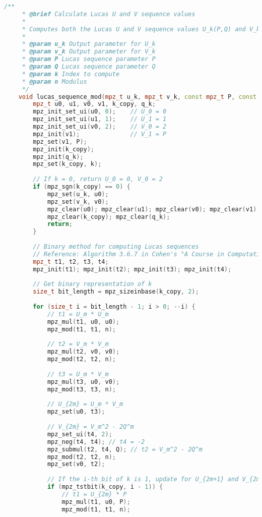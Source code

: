 \begin{lstlisting}[language=C++, caption=Baillie-PSW Test Implementation]
    /**
     * @brief Calculate Lucas U and V sequence values
     * 
     * Computes both the Lucas U and V sequence values U_k(P,Q) and V_k(P,Q) mod n
     * 
     * @param u_k Output parameter for U_k
     * @param v_k Output parameter for V_k
     * @param P Lucas sequence parameter P
     * @param Q Lucas sequence parameter Q
     * @param k Index to compute
     * @param n Modulus
     */
    void lucas_sequence_mod(mpz_t u_k, mpz_t v_k, const mpz_t P, const mpz_t Q, const mpz_t k, const mpz_t n) {
        mpz_t u0, u1, v0, v1, k_copy, q_k;
        mpz_init_set_ui(u0, 0);    // U_0 = 0
        mpz_init_set_ui(u1, 1);    // U_1 = 1
        mpz_init_set_ui(v0, 2);    // V_0 = 2
        mpz_init(v1);              // V_1 = P
        mpz_set(v1, P);
        mpz_init(k_copy);
        mpz_init(q_k);
        mpz_set(k_copy, k);
        
        // If k = 0, return U_0 = 0, V_0 = 2
        if (mpz_sgn(k_copy) == 0) {
            mpz_set(u_k, u0);
            mpz_set(v_k, v0);
            mpz_clear(u0); mpz_clear(u1); mpz_clear(v0); mpz_clear(v1);
            mpz_clear(k_copy); mpz_clear(q_k);
            return;
        }
        
        // Binary method for computing Lucas sequences
        // Reference: Algorithm 3.6.7 in Cohen's "A Course in Computational Algebraic Number Theory"
        mpz_t t1, t2, t3, t4;
        mpz_init(t1); mpz_init(t2); mpz_init(t3); mpz_init(t4);
        
        // Get binary representation of k
        size_t bit_length = mpz_sizeinbase(k_copy, 2);
        
        for (size_t i = bit_length - 1; i > 0; --i) {
            // t1 = U_m * U_m
            mpz_mul(t1, u0, u0);
            mpz_mod(t1, t1, n);
            
            // t2 = V_m * V_m
            mpz_mul(t2, v0, v0);
            mpz_mod(t2, t2, n);
            
            // t3 = U_m * V_m
            mpz_mul(t3, u0, v0);
            mpz_mod(t3, t3, n);
            
            // U_{2m} = U_m * V_m
            mpz_set(u0, t3);
            
            // V_{2m} = V_m^2 - 2Q^m
            mpz_set_ui(t4, 2);
            mpz_neg(t4, t4); // t4 = -2
            mpz_submul(t2, t4, Q); // t2 = V_m^2 - 2Q^m
            mpz_mod(t2, t2, n);
            mpz_set(v0, t2);
            
            // If the i-th bit of k is 1, update for U_{2m+1} and V_{2m+1}
            if (mpz_tstbit(k_copy, i - 1)) {
                // t1 = U_{2m} * P
                mpz_mul(t1, u0, P);
                mpz_mod(t1, t1, n);
                

\end{lstlisting}
